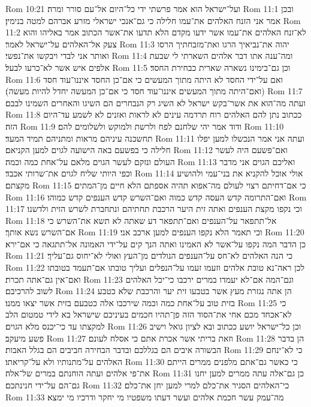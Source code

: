 Rom 10:21  ועל־ישראל הוא אמר פרשתי ידי כל־היום אל־עם סורר ומרה׃
Rom 11:1  ובכן אמר אני הזנח האלהים את־עמו חלילה כי גם־אנכי ישראלי מזרע אברהם למטה בנימין׃
Rom 11:2  לא־זנח האלהים את־עמו אשר ידעו מקדם הלא תדעו את־אשר הכתוב אמר באליהו והוא צעק אל־האלהים על־ישראל לאמר׃
Rom 11:3  יהוה את־נביאיך הרגו ואת־מזבחתיך הרסו ואותר אני לבדי ויבקשו את־נפשי׃
Rom 11:4  ומה־ענה אתו דבר אלהים השארתי לי שבעת אלפים איש אשר לא־כרעו לבעל׃
Rom 11:5  וכן גם־בימינו נשארה שארית כבחירת החסד׃
Rom 11:6  ואם על־ידי החסד לא היתה מתוך המעשים כי אם־כן החסד איננו־עוד חסד (ואם־היתה מתוך המעשים איננו־עוד חסד כי אם־כן המעשה יחדל להיות מעשה)׃
Rom 11:7  ועתה מה־הוא את אשר־בקש ישראל לא השיג רק הנבחרים הם השיגו והאחרים השמינו לבבם׃
Rom 11:8  ככתוב נתן להם האלהים רוח תרדמה עינים לא לראות ואזנים לא לשמע עד־היום הזה׃
Rom 11:9  ודוד אמר יהי שלחנם לפח ולרשת ולמוקש ולשלומים להם׃
Rom 11:10  תחשכנה עיניהם מראות ומתניהם תמיד המעד׃
Rom 11:11  ועתה אני אמר הנכשלו למען יפלו חלילה כי בפשעם באה הישועה לגוים למען הקניאם׃
Rom 11:12  ואם־פשעם היה לעשר העולם ונזקם לעשר הגוים מלאם על־אחת כמה וכמה׃
Rom 11:13  ואליכם הגוים אני מדבר וכפי היותי שליח לגוים את־שרותי אכבד׃
Rom 11:14  אולי אוכל להקניא את בני־עמי ולהושיע מקצתם׃
Rom 11:15  כי אם־דחיתם רצוי לעולם מה־אפוא תהיה אספתם הלא חיים מן־המתים׃
Rom 11:16  ואם־התרומה קדש העסה קדש כמוה ואם־השרש קדש הענפים קדש כמוהו׃
Rom 11:17  וכי נקפו מקצת הענפים ואתה זית היער הרכבת תחתיהם ונתחברת לשרש הזית ולדשנו׃
Rom 11:18  אל־תתפאר על־הענפים ואם־תתפאר דע שאתה לא תשא את־השרש כי אם־השרש נשא אותך׃
Rom 11:19  וכי תאמר הלא נקפו הענפים למען ארכב אני׃
Rom 11:20  כן הדבר המה נקפו על־אשר לא האמינו ואתה הנך קים על־ידי האמונה אל־תתגאה כי אם־ירא׃
Rom 11:21  כי הנה האלהים לא־חס על־הענפים הנולדים מן־העץ ואולי לא־יחוס גם־עליך׃
Rom 11:22  לכן ראה־נא טובת אלהים וזעמו זעמו על־הנפלים ועליך טובתו אם־תעמד בטובתו ואם־אין גם־אתה תכרת׃
Rom 11:23  וגם־המה אם־לא יעמדו במרים ירכבו כי־יכל האלהים לשוב להרכיבם׃
Rom 11:24  הן אתה נגזרת מעץ אשר בטבעו זית יער והרכבת שלא כטבע בזית טוב על־אחת כמה וכמה שירכבו אלה כטבעם בזית אשר יצאו ממנו׃
Rom 11:25  כי לא־אכחד מכם אחי את־הסוד הזה פן־תהיו חכמים בעיניכם שישראל בא לידי טמטום הלב למקצתו עד כי־יכנס מלא הגוים׃
Rom 11:26  וכן כל־ישראל יושע ככתוב ובא לציון גואל וישיב פשע מיעקב׃
Rom 11:27  וזאת בריתי אשר אכרת אתם כי אסלח לעונם׃
Rom 11:28  הן בדבר הבשורה איבים הם בגללכם ובדבר הבחירה חביבים הם בגלל האבות׃
Rom 11:29  כי לא־ינחם האלהים על־מתנותיו ולא על־קריאתו׃
Rom 11:30  כי כאשר גם־אתם מלפנים ממרים הייתם את־פי אלהים ועתה הוחנתם במרים של־אלה׃
Rom 11:31  כן גם־אלה עתה ממרים למען יחנו גם־הם על־ידי חנינתכם׃
Rom 11:32  כי־האלהים הסגיר את־כלם למרי למען יחן את־כלם׃
Rom 11:33  מה־עמק עשר חכמת אלהים ועשר דעתו משפטיו מי יחקר ודרכיו מי ימצא׃
